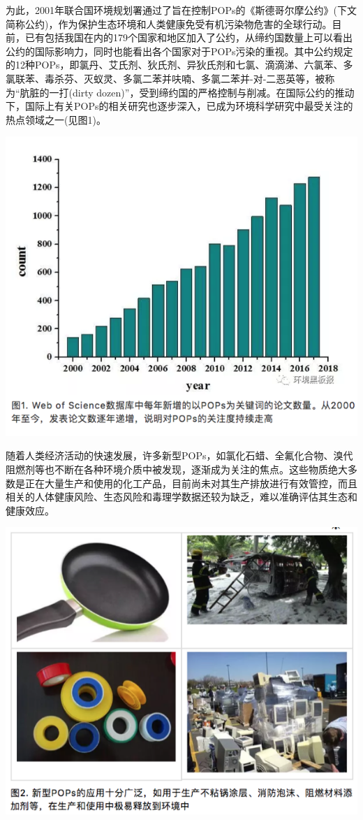 \documentclass[]{book}
\begin{document}
为此，2001年联合国环境规划署通过了旨在控制POPs的《斯德哥尔摩公约》(下文简称公约)，作为保护生态环境和人类健康免受有机污染物危害的全球行动。目前，已有包括我国在内的179个国家和地区加入了公约，从缔约国数量上可以看出公约的国际影响力，同时也能看出各个国家对于POPs污染的重视。其中公约规定的12种POPs，即氯丹、艾氏剂、狄氏剂、异狄氏剂和七氯、滴滴涕、六氯苯、多氯联苯、毒杀芬、灭蚁灵、多氯二苯并呋喃、多氯二苯并-对-二恶英等，被称为``肮脏的一打(dirty
dozen)''，受到缔约国的严格控制与削减。在国际公约的推动下，国际上有关POPs的相关研究也逐步深入，已成为环境科学研究中最受关注的热点领域之一(见图1)。

\includegraphics[width=8.33in]{images/gongyue1}

随着人类经济活动的快速发展，许多新型POPs，如氯化石蜡、全氟化合物、溴代阻燃剂等也不断在各种环境介质中被发现，逐渐成为关注的焦点。这些物质绝大多数是正在大量生产和使用的化工产品，目前尚未对其生产排放进行有效管控，而且相关的人体健康风险、生态风险和毒理学数据还较为缺乏，难以准确评估其生态和健康效应。

\includegraphics[width=8.33in]{images/gongyue2}
\end{document}
